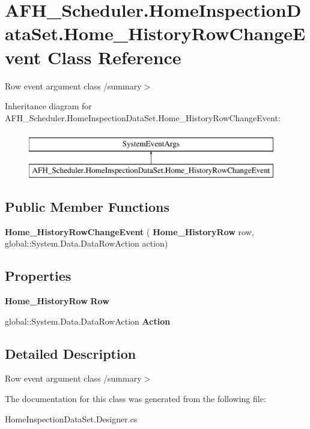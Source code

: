 \section{A\+F\+H\+\_\+\+Scheduler.\+Home\+Inspection\+Data\+Set.\+Home\+\_\+\+History\+Row\+Change\+Event Class Reference}
\label{class_a_f_h___scheduler_1_1_home_inspection_data_set_1_1_home___history_row_change_event}


Row event argument class /summary$>$  


Inheritance diagram for A\+F\+H\+\_\+\+Scheduler.\+Home\+Inspection\+Data\+Set.\+Home\+\_\+\+History\+Row\+Change\+Event\+:\begin{figure}[H]
\begin{center}
\leavevmode
\includegraphics[height=2.000000cm]{class_a_f_h___scheduler_1_1_home_inspection_data_set_1_1_home___history_row_change_event}
\end{center}
\end{figure}
\subsection*{Public Member Functions}
\begin{DoxyCompactItemize}
\item 
\mbox{\label{class_a_f_h___scheduler_1_1_home_inspection_data_set_1_1_home___history_row_change_event_a3b289c21471ebcafee1abf733e41d518}} 
{\bfseries Home\+\_\+\+History\+Row\+Change\+Event} (\textbf{ Home\+\_\+\+History\+Row} row, global\+::\+System.\+Data.\+Data\+Row\+Action action)
\end{DoxyCompactItemize}
\subsection*{Properties}
\begin{DoxyCompactItemize}
\item 
\mbox{\label{class_a_f_h___scheduler_1_1_home_inspection_data_set_1_1_home___history_row_change_event_aadbeefffdcbb06829b63291636323cc5}} 
\textbf{ Home\+\_\+\+History\+Row} {\bfseries Row}\hspace{0.3cm}{\ttfamily  [get]}
\item 
\mbox{\label{class_a_f_h___scheduler_1_1_home_inspection_data_set_1_1_home___history_row_change_event_af7ede047079ba0491b4b10009ba18158}} 
global\+::\+System.\+Data.\+Data\+Row\+Action {\bfseries Action}\hspace{0.3cm}{\ttfamily  [get]}
\end{DoxyCompactItemize}


\subsection{Detailed Description}
Row event argument class /summary$>$ 

The documentation for this class was generated from the following file\+:\begin{DoxyCompactItemize}
\item 
Home\+Inspection\+Data\+Set.\+Designer.\+cs\end{DoxyCompactItemize}
